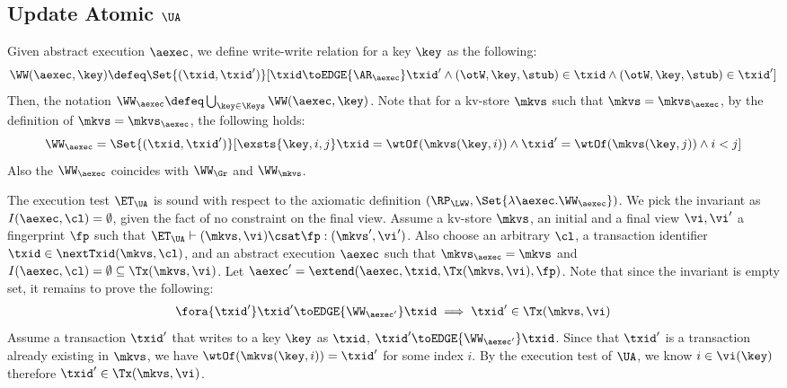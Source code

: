 \subsection{Update Atomic \( \UA \)}
\label{sec:sound-complete-ua}

Given abstract execution \( \aexec \), we define write-write relation for a key \( \key \) as the following:
\[ 
    \WW(\aexec,\key) \defeq \Set{(\txid, \txid')}[\txid \toEDGE{\AR_\aexec} \txid' \land (\otW,\key, \stub ) \in \txid \land (\otW,\key, \stub ) \in \txid' ]
\]
Then, the notation \( \WW_\aexec \defeq \bigcup_{\key \in \Keys} \WW(\aexec, \key) \).
Note that for a kv-store \( \mkvs \) such that \( \mkvs = \mkvs_\aexec \),
by the definition of  \(  \mkvs = \mkvs_\aexec \), 
the following holds:
\[
    \WW_\aexec = \Set{(\txid, \txid')}[\exsts{\key, i,j } \txid = \wtOf(\mkvs(\key, i)) \land \txid' = \wtOf(\mkvs(\key, j)) \land i < j]
\]
Also the \( \WW_\aexec \) coincides with \( \WW_\Gr \) and \( \WW_\mkvs \).

The execution test $\ET_\UA$ is sound with respect to the axiomatic definition \( (\RP_{\LWW}, \Set{\lambda \aexec. \WW_\aexec }) \).
We pick the invariant as \( I( \aexec, \cl ) = \emptyset \), given the fact of no constraint on the final view.
Assume a kv-store $\mkvs$, an initial and a final view $\vi, \vi'$  a fingerprint $\fp$ 
such that $\ET_{\UA} \vdash (\mkvs, \vi) \csat \fp: (\mkvs', \vi')$. 
Also choose an arbitrary $\cl$, a transaction identifier $\txid \in \nextTxid(\mkvs, \cl)$, 
and an abstract execution $\aexec$ such that $\mkvs_{\aexec} = \mkvs$ and 
\( I(\aexec, \cl) =  \emptyset \subseteq \Tx(\mkvs, \vi) \).
Let \( \aexec' = \extend(\aexec, \txid, \Tx(\mkvs, \vi), \fp ) \).
Note that since the invariant is empty set, it remains to prove the following:
\[
    \begin{array}{@{}l@{}}
        \fora{ \txid' } \txid' \toEDGE{\WW_{\aexec'}} \txid \implies \txid' \in \Tx(\mkvs, \vi)
    \end{array}
\]
Assume a transaction \( \txid' \) that writes to a key \( \key \) as \( \txid \), \ie \( \txid' \toEDGE{\WW_{\aexec'}} \txid \).
Since that \( \txid' \) is a transaction already existing in \( \mkvs\),
we have \( \wtOf(\mkvs(\key, i)) = \txid' \) for some index \( i \).
By the execution test of \( \UA \), we know \( i \in \vi(\key) \) therefore \( \txid' \in \Tx(\mkvs, \vi) \).

